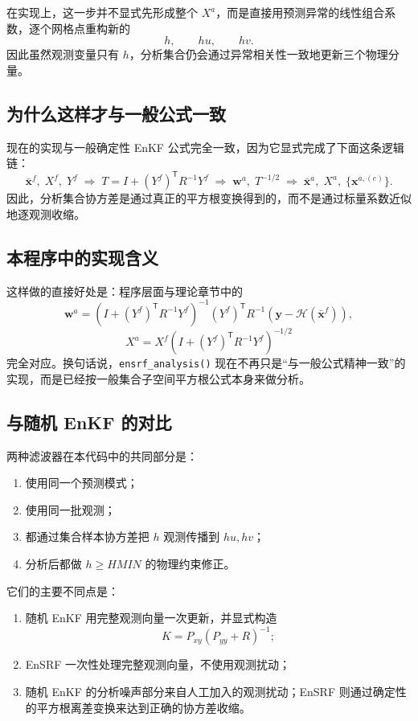 \documentclass[12pt,a4paper]{article}
\begin{document}
在实现上，这一步并不显式先形成整个 $X^a$，而是直接用预测异常的线性组合系数，逐个网格点重构新的
\[
h,\qquad hu,\qquad hv.
\]
因此虽然观测变量只有 $h$，分析集合仍会通过异常相关性一致地更新三个物理分量。

\subsection{为什么这样才与一般公式一致}

现在的实现与一般确定性 EnKF 公式完全一致，因为它显式完成了下面这条逻辑链：
\[
\bar{\mathbf{x}}^f,\; X^f,\; Y^f
\;\Longrightarrow\;
T = I + (Y^f)^{\mathsf T} R^{-1} Y^f
\;\Longrightarrow\;
\mathbf{w}^a,\; T^{-1/2}
\;\Longrightarrow\;
\bar{\mathbf{x}}^a,\; X^a,\; \{\mathbf{x}^{a,(e)}\}.
\]
因此，分析集合协方差是通过真正的平方根变换得到的，而不是通过标量系数近似地逐观测收缩。

\subsection{本程序中的实现含义}

这样做的直接好处是：程序层面与理论章节中的
\[
\mathbf{w}^a
= \left(I + (Y^f)^{\mathsf T} R^{-1} Y^f\right)^{-1}
(Y^f)^{\mathsf T} R^{-1}
\left(\mathbf{y}-\mathcal{H}(\bar{\mathbf{x}}^f)\right),
\]
\[
X^a = X^f\left(I + (Y^f)^{\mathsf T} R^{-1} Y^f\right)^{-1/2}
\]
完全对应。换句话说，\texttt{ensrf\_analysis()} 现在不再只是“与一般公式精神一致”的实现，而是已经按一般集合子空间平方根公式本身来做分析。

\subsection{与随机 EnKF 的对比}

两种滤波器在本代码中的共同部分是：
\begin{enumerate}
    \item 使用同一个预测模式；
    \item 使用同一批观测；
    \item 都通过集合样本协方差把 $h$ 观测传播到 $hu,hv$；
    \item 分析后都做 $h \ge HMIN$ 的物理约束修正。
\end{enumerate}

它们的主要不同点是：
\begin{enumerate}
    \item 随机 EnKF 用完整观测向量一次更新，并显式构造
    \[
    K = P_{xy}(P_{yy}+R)^{-1};
    \]
    \item EnSRF 一次性处理完整观测向量，不使用观测扰动；
    \item 随机 EnKF 的分析噪声部分来自人工加入的观测扰动；EnSRF 则通过确定性的平方根离差变换来达到正确的协方差收缩。
\end{enumerate}
\end{document}
